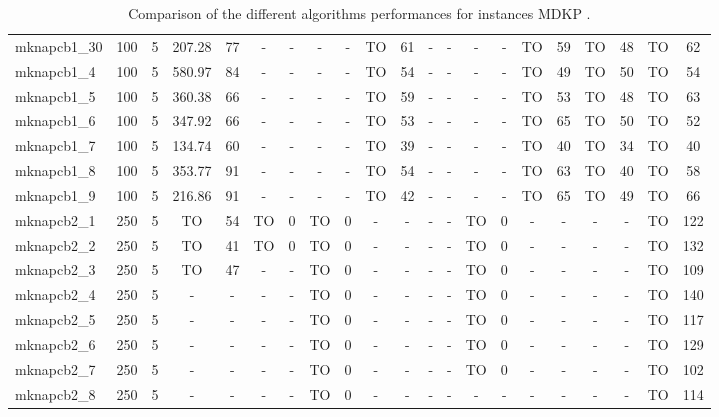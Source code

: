 \begin{sidewaystable}[!ht]
{\begin{tabular}{lcccccccccccccccccccc}
mknapcb1\_30 & 100 & 5 &  \textcolor{blue2}{207.28} & 77 &  - &  - &  - &  - & TO & 61 &  - &  - &  - &  - & TO & 59 & TO & 48 & TO & 62 \\
mknapcb1\_4 & 100 & 5 &  \textcolor{blue2}{580.97} & 84 &  - &  - &  - &  - & TO & 54 &  - &  - &  - &  - & TO & 49 & TO & 50 & TO & 54 \\
mknapcb1\_5 & 100 & 5 &  \textcolor{blue2}{360.38} & 66 &  - &  - &  - &  - & TO & 59 &  - &  - &  - &  - & TO & 53 & TO & 48 & TO & 63 \\
mknapcb1\_6 & 100 & 5 &  \textcolor{blue2}{347.92} & 66 &  - &  - &  - &  - & TO & 53 &  - &  - &  - &  - & TO & 65 & TO & 50 & TO & 52 \\
mknapcb1\_7 & 100 & 5 &  \textcolor{blue2}{134.74} & 60 &  - &  - &  - &  - & TO & 39 &  - &  - &  - &  - & TO & 40 & TO & 34 & TO & 40 \\
mknapcb1\_8 & 100 & 5 &  \textcolor{blue2}{353.77} & 91 &  - &  - &  - &  - & TO & 54 &  - &  - &  - &  - & TO & 63 & TO & 40 & TO & 58 \\
mknapcb1\_9 & 100 & 5 &  \textcolor{blue2}{216.86} & 91 &  - &  - &  - &  - & TO & 42 &  - &  - &  - &  - & TO & 65 & TO & 49 & TO & 66 \\
mknapcb2\_1 & 250 & 5 & TO & 54 & TO & 0 & TO & 0 &  - &  - &  - &  - & TO & 0 &  - &  - &  - &  - & TO & 122 \\
mknapcb2\_2 & 250 & 5 & TO & 41 & TO & 0 & TO & 0 &  - &  - &  - &  - & TO & 0 &  - &  - &  - &  - & TO & 132 \\
mknapcb2\_3 & 250 & 5 & TO & 47 &  - &  - & TO & 0 &  - &  - &  - &  - & TO & 0 &  - &  - &  - &  - & TO & 109 \\
mknapcb2\_4 & 250 & 5 &  - &  - &  - &  - & TO & 0 &  - &  - &  - &  - & TO & 0 &  - &  - &  - &  - & TO & 140 \\
mknapcb2\_5 & 250 & 5 &  - &  - &  - &  - & TO & 0 &  - &  - &  - &  - & TO & 0 &  - &  - &  - &  - & TO & 117 \\
mknapcb2\_6 & 250 & 5 &  - &  - &  - &  - & TO & 0 &  - &  - &  - &  - & TO & 0 &  - &  - &  - &  - & TO & 129 \\
mknapcb2\_7 & 250 & 5 &  - &  - &  - &  - & TO & 0 &  - &  - &  - &  - & TO & 0 &  - &  - &  - &  - & TO & 102 \\
mknapcb2\_8 & 250 & 5 &  - &  - &  - &  - & TO & 0 &  - &  - &  - &  - &  - &  - &  - &  - &  - &  - & TO & 114 \\
\bottomrule
\end{tabular}
}%
\caption{Comparison of the different algorithms performances for instances MDKP .}
\label{tab:table_compare_MDKP }
\end{sidewaystable}
